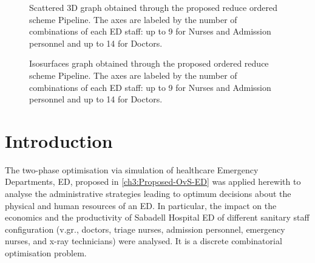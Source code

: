 \documentclass[11pt]{article} %
\begin{document}
\begin{figure}[htb!]
{\par}
\caption{Scattered  3D graph obtained through the proposed reduce ordered  scheme Pipeline. The axes are labeled by the number of combinations of each ED staff: up to 9 for Nurses and Admission personnel and up to 14 for Doctors.}
\label{fig:3d_ordered}
\end{figure}

\begin{figure}[htb!]
{\par}
\caption{Isosurfaces graph obtained through the proposed ordered reduce scheme Pipeline. The axes are labeled by the number of combinations of each ED staff: up to 9 for Nurses and Admission personnel and up to 14 for Doctors.}
\label{fig:region_pipe}
\end{figure}



\section{Introduction}

The two-phase optimisation via simulation of healthcare Emergency
Departments, ED, proposed in \ref{ch3:Proposed-OvS-ED} was applied
herewith to analyse the administrative strategies leading to optimum
decisions about the physical and human resources of an ED. In particular,
the impact on the economics and the productivity of Sabadell Hospital
ED of different sanitary staff configuration (v.gr., doctors, triage
nurses, admission personnel, emergency nurses, and x-ray technicians)
were analysed. It is a discrete combinatorial optimisation problem.
\end{document}
